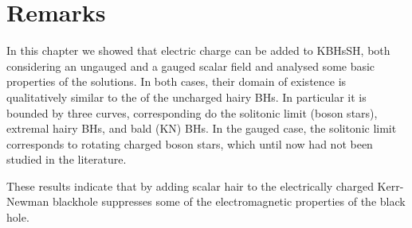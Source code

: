 \section{Remarks}
\label{sec_remarks}

In this chapter we showed that electric charge can be added to KBHsSH, both considering an ungauged and a gauged scalar field and analysed some basic properties of the solutions.
In both cases, their domain of existence is qualitatively similar to the of the uncharged hairy BHs.
In particular it is bounded by three curves, corresponding do the solitonic limit (boson stars), extremal hairy BHs, and bald (KN) BHs.
In the gauged case, the solitonic limit corresponds to rotating charged boson stars, which until now had not been studied in the literature. 

These results indicate that by adding scalar hair to the electrically charged Kerr-Newman blackhole suppresses some of the electromagnetic properties of the black hole.

%

